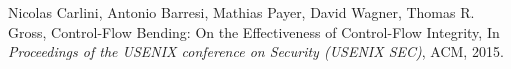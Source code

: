 \documentclass[11pt,a4paper,bibtotoc,idxtotoc,headsepline,footsepline,footexclude,BCOR20mm,DIV10]{scrbook}
\begin{document}
\begin{thebibliography}{50}
 Nicolas Carlini, Antonio Barresi, Mathias Payer, David Wagner, Thomas R. Gross,
 {Control-Flow Bending: On the Effectiveness of Control-Flow Integrity}, In
 \emph{Proceedings of the USENIX conference on Security (USENIX SEC)}, ACM, 2015.
% 
% 
% 
% 
% 
% 






\end{thebibliography}
	
 
\end{document}
